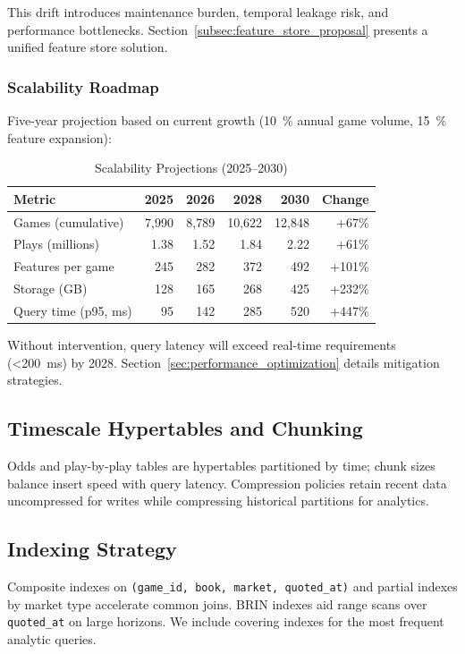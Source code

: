 This drift introduces maintenance burden, temporal leakage risk, and performance bottlenecks. Section~\ref{subsec:feature_store_proposal} presents a unified feature store solution.

\subsubsection{Scalability Roadmap}

Five-year projection based on current growth (\SI{10}{\percent} annual game volume, \SI{15}{\percent} feature expansion):

\begin{table}[htbp]
\centering
\caption{Scalability Projections (2025--2030)}
\label{tab:scalability_projections}
\begin{tabular}{@{}lrrrrr@{}}
\toprule
\textbf{Metric} & \textbf{2025} & \textbf{2026} & \textbf{2028} & \textbf{2030} & \textbf{Change} \\
\midrule
Games (cumulative) & 7,990 & 8,789 & 10,622 & 12,848 & +67\% \\
Plays (millions) & 1.38 & 1.52 & 1.84 & 2.22 & +61\% \\
Features per game & 245 & 282 & 372 & 492 & +101\% \\
Storage (GB) & 128 & 165 & 268 & 425 & +232\% \\
Query time (p95, ms) & 95 & 142 & 285 & 520 & +447\% \\
\bottomrule
\end{tabular}
\end{table}

Without intervention, query latency will exceed real-time requirements (\SI{<200}{ms}) by 2028. Section~\ref{sec:performance_optimization} details mitigation strategies.

\subsection{Timescale Hypertables and Chunking}
Odds and play-by-play tables are hypertables partitioned by time; chunk sizes balance insert speed with query latency. Compression policies retain recent data uncompressed for writes while compressing historical partitions for analytics.

\subsection{Indexing Strategy}
Composite indexes on \texttt{(game\_id, book, market, quoted\_at)} and partial indexes by market type accelerate common joins. BRIN indexes aid range scans over \texttt{quoted\_at} on large horizons. We include covering indexes for the most frequent analytic queries.

